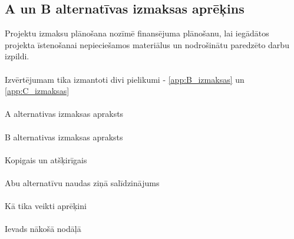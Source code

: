 \subsection{A un B alternatīvas izmaksas aprēķins}
Projektu izmaksu plānošana nozīmē finansējuma plānošanu, lai iegādātos projekta
īstenošanai nepieciešamos materiālus un nodrošinātu paredzēto darbu izpildi.
\paragraph{}
Izvērtējumam tika izmantoti divi pielikumi - \ref{app:B_izmaksas} un \ref{app:C_izmaksas}
\paragraph{}
A alternativas izmaksas apraksts 
\paragraph{}
B alternativas izmaksas apraksts
\paragraph{}
Kopigais un atšķirīgais
\paragraph{}
Abu alternatīvu naudas ziņā salīdzinājums
\paragraph{}
Kā tika veikti aprēķini
\paragraph{}
Ievads nākošā nodāļā
